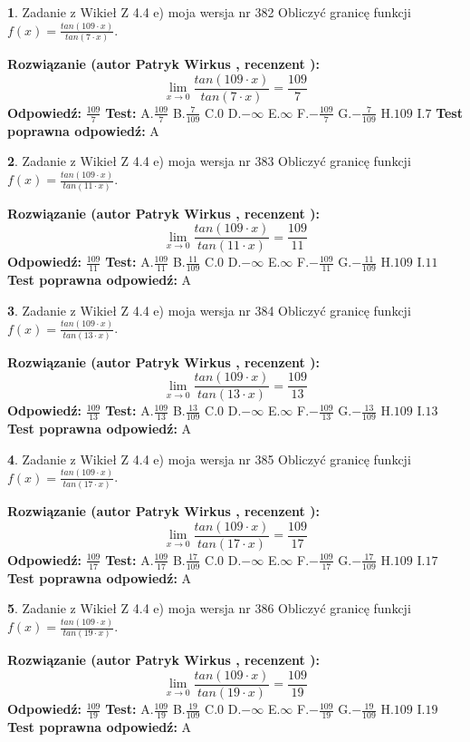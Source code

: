 \documentclass[12pt, a4paper]{article}
\theoremstyle{definition} %
\newtheorem{zad}{}
\newcommand{\zadStart}[1]{\begin{zad}#1\newline}
\newcommand{\zadStop}{\end{zad}}
\newcommand{\rozwStart}[2]{\noindent \textbf{Rozwiązanie (autor #1 , recenzent #2): }\newline}
\newcommand{\rozwStop}{\newline}
\newcommand{\odpStart}{\noindent \textbf{Odpowiedź:}\newline}
\newcommand{\odpStop}{\newline}
\newcommand{\testStart}{\noindent \textbf{Test:}\newline}
\newcommand{\testStop}{\newline}
\newcommand{\kluczStart}{\noindent \textbf{Test poprawna odpowiedź:}\newline}
\newcommand{\kluczStop}{\newline}
\begin{document}
\zadStart{Zadanie z Wikieł Z 4.4 e) moja wersja nr 382}
Obliczyć granicę funkcji $f(x)=\frac{tan(109\cdot x)}{tan(7\cdot x)}$.
\zadStop
\rozwStart{Patryk Wirkus}{}
$$\lim\limits_{x\to 0}\frac{tan(109\cdot x)}{tan(7\cdot x)}=
\frac{109}{7}$$
\rozwStop
\odpStart
$\frac{109}{7}$
\odpStop
\testStart
A.$\frac{109}{7}$
B.$\frac{7}{109}$
C.$0$
D.$-\infty$
E.$\infty$
F.$-\frac{109}{7}$
G.$-\frac{7}{109}$
H.$109$
I.$7$
\testStop
\kluczStart
A
\kluczStop



\zadStart{Zadanie z Wikieł Z 4.4 e) moja wersja nr 383}
Obliczyć granicę funkcji $f(x)=\frac{tan(109\cdot x)}{tan(11\cdot x)}$.
\zadStop
\rozwStart{Patryk Wirkus}{}
$$\lim\limits_{x\to 0}\frac{tan(109\cdot x)}{tan(11\cdot x)}=
\frac{109}{11}$$
\rozwStop
\odpStart
$\frac{109}{11}$
\odpStop
\testStart
A.$\frac{109}{11}$
B.$\frac{11}{109}$
C.$0$
D.$-\infty$
E.$\infty$
F.$-\frac{109}{11}$
G.$-\frac{11}{109}$
H.$109$
I.$11$
\testStop
\kluczStart
A
\kluczStop



\zadStart{Zadanie z Wikieł Z 4.4 e) moja wersja nr 384}
Obliczyć granicę funkcji $f(x)=\frac{tan(109\cdot x)}{tan(13\cdot x)}$.
\zadStop
\rozwStart{Patryk Wirkus}{}
$$\lim\limits_{x\to 0}\frac{tan(109\cdot x)}{tan(13\cdot x)}=
\frac{109}{13}$$
\rozwStop
\odpStart
$\frac{109}{13}$
\odpStop
\testStart
A.$\frac{109}{13}$
B.$\frac{13}{109}$
C.$0$
D.$-\infty$
E.$\infty$
F.$-\frac{109}{13}$
G.$-\frac{13}{109}$
H.$109$
I.$13$
\testStop
\kluczStart
A
\kluczStop



\zadStart{Zadanie z Wikieł Z 4.4 e) moja wersja nr 385}
Obliczyć granicę funkcji $f(x)=\frac{tan(109\cdot x)}{tan(17\cdot x)}$.
\zadStop
\rozwStart{Patryk Wirkus}{}
$$\lim\limits_{x\to 0}\frac{tan(109\cdot x)}{tan(17\cdot x)}=
\frac{109}{17}$$
\rozwStop
\odpStart
$\frac{109}{17}$
\odpStop
\testStart
A.$\frac{109}{17}$
B.$\frac{17}{109}$
C.$0$
D.$-\infty$
E.$\infty$
F.$-\frac{109}{17}$
G.$-\frac{17}{109}$
H.$109$
I.$17$
\testStop
\kluczStart
A
\kluczStop



\zadStart{Zadanie z Wikieł Z 4.4 e) moja wersja nr 386}
Obliczyć granicę funkcji $f(x)=\frac{tan(109\cdot x)}{tan(19\cdot x)}$.
\zadStop
\rozwStart{Patryk Wirkus}{}
$$\lim\limits_{x\to 0}\frac{tan(109\cdot x)}{tan(19\cdot x)}=
\frac{109}{19}$$
\rozwStop
\odpStart
$\frac{109}{19}$
\odpStop
\testStart
A.$\frac{109}{19}$
B.$\frac{19}{109}$
C.$0$
D.$-\infty$
E.$\infty$
F.$-\frac{109}{19}$
G.$-\frac{19}{109}$
H.$109$
I.$19$
\testStop
\kluczStart
A
\kluczStop
\end{document}
